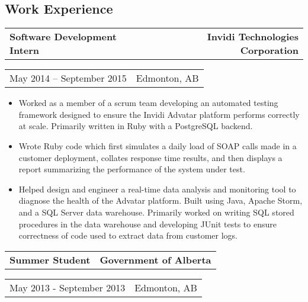 \documentclass[10pt,letterpaper]{article}
\makeatletter
\newcommand{\headerrow}[2]
{\begin{tabular*}{\linewidth}{l@{\extracolsep{\fill}}r}
	#1 &
	#2 \\
\end{tabular*}}
\makeatother
\begin{document}
\subsection*{Work Experience}
       \headerrow
                {\textbf{Software Development Intern}}
		{\textbf{Invidi Technologies Corporation}}
       \headerrow
		{May 2014 -- September 2015 }
                {Edmonton, AB}

       \begin{itemize}
          \itemsep0em
                \item Worked as a member of a scrum team developing an automated testing framework designed to ensure the Invidi Advatar platform performs correctly at scale. Primarily written in Ruby with a PostgreSQL backend. %
                \item Wrote Ruby code which first simulates a daily load of SOAP calls made in a customer deployment, collates response time results, and then displays a report summarizing the performance of the system under test.
                \item Helped design and engineer a real-time data analysis and monitoring tool to diagnose the health of the Advatar platform. Built  using Java, Apache Storm, and a SQL Server data warehouse. Primarily worked on writing SQL stored procedures in the data warehouse and developing JUnit tests to ensure correctness of code used to extract data from customer logs.
        \end{itemize}
	\headerrow
                {\textbf{Summer Student}}
		{\textbf{Government of Alberta}}
	\headerrow
		{May 2013 - September 2013}
		{Edmonton, AB}
		
\end{document}
